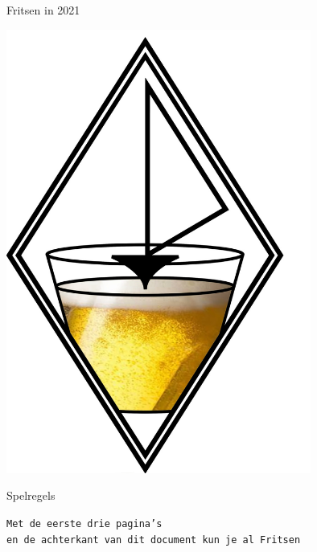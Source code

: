 \thispagestyle{empty}
\begingroup
    \fontsize{80pt}{82pt}\selectfont
    \begin{center}
        Fritsen in 2021  
    \end{center}
\endgroup

\vspace{0.55cm}

\begin{center}
    \includegraphics[width=10cm]{bier.jpeg}
\end{center}

\begingroup
    \fontsize{80pt}{82pt}\selectfont
    \begin{center}
        Spelregels  
    \end{center}
\endgroup

\vspace{0.1cm}

\begingroup
    \fontsize{30pt}{32pt}\selectfont
    \begin{center}
        \texttt{Met de eerste drie pagina's \\en de achterkant van dit document kun je al Fritsen}
    \end{center}
\endgroup

\newpage